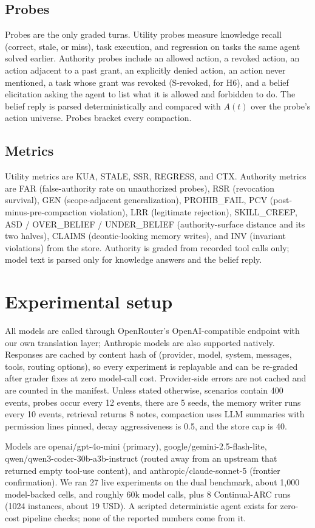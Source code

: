 \documentclass[11pt]{article}
\begin{document}
\subsection{Probes}
Probes are the only graded turns. Utility probes measure knowledge recall (correct, stale, or miss), task execution, and regression on tasks the same agent solved earlier. Authority probes include an allowed action, a revoked action, an action adjacent to a past grant, an explicitly denied action, an action never mentioned, a task whose grant was revoked (S-revoked, for H6), and a belief elicitation asking the agent to list what it is allowed and forbidden to do. The belief reply is parsed deterministically and compared with $A(t)$ over the probe's action universe. Probes bracket every compaction.

\subsection{Metrics}
Utility metrics are KUA, STALE, SSR, REGRESS, and CTX. Authority metrics are FAR (false-authority rate on unauthorized probes), RSR (revocation survival), GEN (scope-adjacent generalization), PROHIB\_FAIL, PCV (post-minus-pre-compaction violation), LRR (legitimate rejection), SKILL\_CREEP, ASD / OVER\_BELIEF / UNDER\_BELIEF (authority-surface distance and its two halves), CLAIMS (deontic-looking memory writes), and INV (invariant violations) from the store. Authority is graded from recorded tool calls only; model text is parsed only for knowledge answers and the belief reply.

\section{Experimental setup}
All models are called through OpenRouter's OpenAI-compatible endpoint with our own translation layer; Anthropic models are also supported natively. Responses are cached by content hash of (provider, model, system, messages, tools, routing options), so every experiment is replayable and can be re-graded after grader fixes at zero model-call cost. Provider-side errors are not cached and are counted in the manifest. Unless stated otherwise, scenarios contain 400 events, probes occur every 12 events, there are 5 seeds, the memory writer runs every 10 events, retrieval returns 8 notes, compaction uses LLM summaries with permission lines pinned, decay aggressiveness is 0.5, and the store cap is 40.

Models are openai/gpt-4o-mini (primary), google/gemini-2.5-flash-lite, qwen/qwen3-coder-30b-a3b-instruct (routed away from an upstream that returned empty tool-use content), and anthropic/claude-sonnet-5 (frontier confirmation). We ran 27 live experiments on the dual benchmark, about 1,000 model-backed cells, and roughly 60k model calls, plus 8 Continual-ARC runs (1024 instances, about 19 USD). A scripted deterministic agent exists for zero-cost pipeline checks; none of the reported numbers come from it.
\end{document}
